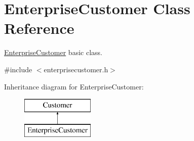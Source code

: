 \hypertarget{class_enterprise_customer}{\section{\-Enterprise\-Customer \-Class \-Reference}
\label{class_enterprise_customer}
}


\hyperlink{class_enterprise_customer}{\-Enterprise\-Customer} basic class.  




{\ttfamily \#include $<$enterprisecustomer.\-h$>$}

\-Inheritance diagram for \-Enterprise\-Customer\-:\begin{figure}[H]
\begin{center}
\leavevmode
\includegraphics[height=2.000000cm]{class_enterprise_customer}
\end{center}
\end{figure}
